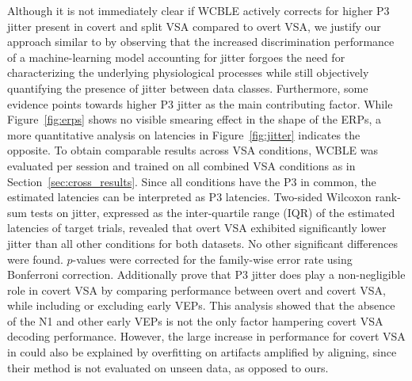 Although it is not immediately clear if WCBLE actively corrects for higher P3 jitter
present in covert and split VSA compared to overt VSA,
we justify our approach similar to \cite{hardiansyah2020single} by
observing that the increased discrimination performance of a machine-learning
model accounting for jitter forgoes the need for characterizing the underlying
physiological processes while still objectively quantifying the presence of
jitter between data classes.
Furthermore, some evidence points towards higher P3 jitter as the main
contributing factor.
While Figure~\ref{fig:erps} shows no visible smearing effect in
the shape of the ERPs, a more quantitative analysis on latencies in
Figure~\ref{fig:jitter} indicates the opposite.
To obtain comparable results across VSA conditions, WCBLE was
evaluated per session and trained on all combined VSA conditions as in
Section~\ref{sec:cross_results}.
Since all conditions have the P3 in common, the estimated latencies can be
interpreted as P3 latencies.
Two-sided Wilcoxon rank-sum tests on jitter, expressed as the inter-quartile
range (IQR) of the estimated latencies of target trials, revealed that overt
VSA exhibited significantly lower jitter than all other conditions for both datasets.
No other significant differences were found.
$p$-values were corrected for the family-wise error rate using Bonferroni
correction.
Additionally \cite{Arico2014} prove that P3 jitter does play a
non-negligible role in covert VSA by comparing performance between
overt and covert VSA, while including or excluding early VEPs.
This analysis showed that the absence of the N1 and other early VEPs is not the
only factor hampering covert VSA decoding performance.
However, the large increase in performance for covert VSA in \cite{Arico2014} could also
be explained by overfitting on artifacts amplified by aligning, since their
method is not evaluated on unseen data, as opposed to ours.


